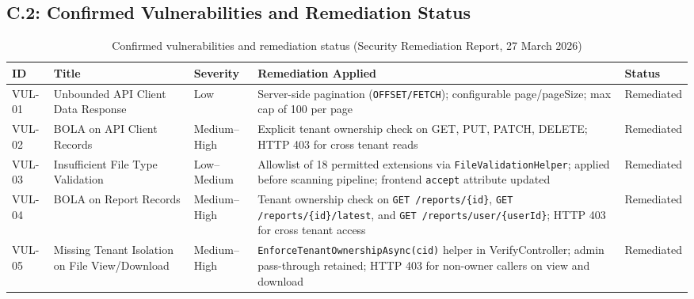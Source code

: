 \subsection*{C.2: Confirmed Vulnerabilities and Remediation Status}

\begin{table}[H]
  \centering
  \smalltable
  \footnotesize
  {%
  \setlength{\tabcolsep}{5pt}
  \renewcommand{\arraystretch}{1.3}
  \begin{tabular}{|>{\centering\arraybackslash}p{}|
                  >{\raggedright\arraybackslash}p{}|
                  >{\centering\arraybackslash}p{}|
                  >{\raggedright\arraybackslash}p{}|
                  >{\centering\arraybackslash}p{}|}
    \hline
    \textbf{ID} & \textbf{Title} & \textbf{Severity} & \textbf{Remediation Applied} & \textbf{Status} \\
    \hline\hline
    VUL-01 & Unbounded API Client Data Response & Low & Server-side pagination (\texttt{OFFSET/FETCH}); configurable page/pageSize; max cap of 100 per page & Remediated \\
    \hline
    VUL-02 & BOLA on API Client Records & Medium--High & Explicit tenant ownership check on GET, PUT, PATCH, DELETE; HTTP 403 for cross tenant reads & Remediated \\
    \hline
    VUL-03 & Insufficient File Type Validation & Low--Medium & Allowlist of 18 permitted extensions via \texttt{FileValidationHelper}; applied before scanning pipeline; frontend \texttt{accept} attribute updated & Remediated \\
    \hline
    VUL-04 & BOLA on Report Records & Medium--High & Tenant ownership check on \texttt{GET /reports/\{id\}}, \texttt{GET /reports/\{id\}/latest}, and \texttt{GET /reports/user/\{userId\}}; HTTP 403 for cross tenant access & Remediated \\
    \hline
    VUL-05 & Missing Tenant Isolation on File View/Download & Medium--High & \texttt{EnforceTenantOwnershipAsync(cid)} helper in VerifyController; admin pass-through retained; HTTP 403 for non-owner callers on view and download & Remediated \\
    \hline
  \end{tabular}
  }%
  \captionsetup{type=table}
  \caption{Confirmed vulnerabilities and remediation status (Security Remediation Report, 27 March 2026)}
  \label{tab:security-vulns}
\end{table}

